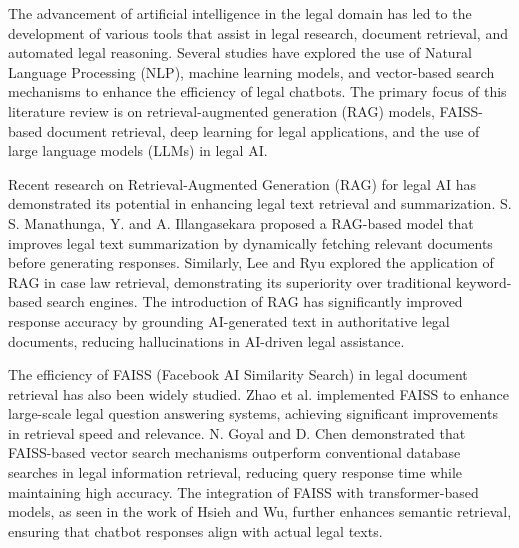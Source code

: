 The advancement of artificial intelligence in the legal domain has led to the development of various tools that assist in legal research, document retrieval, and automated legal reasoning. Several studies have explored the use of Natural Language Processing (NLP)\cite{khurana2023natural}, machine learning models, and vector-based search mechanisms to enhance the efficiency of legal chatbots. The primary focus of this literature review is on retrieval-augmented generation (RAG) models, FAISS-based document retrieval, deep learning for legal applications, and the use of large language models (LLMs) in legal AI.  

Recent research on Retrieval-Augmented Generation (RAG)\cite{gao2023retrieval} for legal AI has demonstrated its potential in enhancing legal text retrieval and summarization. S. S. Manathunga, Y. and A. Illangasekara\cite{manathunga2023retrieval} proposed a RAG-based model that improves legal text summarization by dynamically fetching relevant documents before generating responses. Similarly, Lee and Ryu \cite{ryu-etal-2023-retrieval} explored the application of RAG in case law retrieval, demonstrating its superiority over traditional keyword-based search engines. The introduction of RAG has significantly improved response accuracy by grounding AI-generated text in authoritative legal documents, reducing hallucinations in AI-driven legal assistance.  


The efficiency of FAISS (Facebook AI Similarity Search) in legal document retrieval has also been widely studied. Zhao et al. \cite{devlin-etal-2019-bert} implemented FAISS to enhance large-scale legal question answering systems, achieving significant improvements in retrieval speed and relevance. N. Goyal and D. Chen \cite{inbook} demonstrated that FAISS-based vector search mechanisms outperform conventional database searches in legal information retrieval, reducing query response time while maintaining high accuracy. The integration of FAISS with transformer-based models, as seen in the work of Hsieh and Wu, further enhances semantic retrieval, ensuring that chatbot responses align with actual legal texts.  


